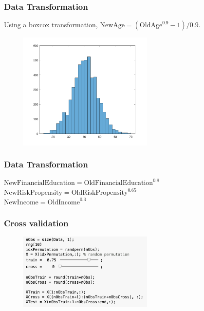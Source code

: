 \documentclass{beamer}
\begin{document}
\begin{frame}
\frametitle{Data Transformation}
Using a boxcox transformation, $\text{NewAge} = (\text{OldAge}^{0.9}-1)/0.9.$
\begin{figure}
\includegraphics[width=0.6\textwidth]{age_boxcoxed}
\end{figure}
\end{frame}

\begin{frame}
	\frametitle{Data Transformation}
	$\text{NewFinancialEducation} = \text{OldFinancialEducation}^{0.8}$\\
	$\text{NewRiskPropensity} = \text{OldRiskPropensity}^{0.65}$\\
	$\text{NewIncome} = \text{OldIncome}^{0.3}$\\
\end{frame}



\begin{frame}
\frametitle{Cross validation}
	\begin{figure}
\includegraphics[width=0.6\textwidth]{flex}
\end{figure}
\end{frame}
\end{document}
